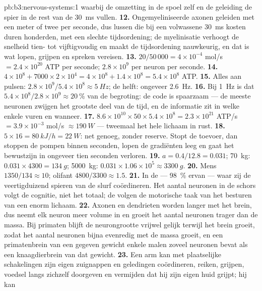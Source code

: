 \begin{solution}{pb:b3:nervous-systems:1}
waarbij de omzetting in de spoel zelf en de geleiding de spier in de
rest van de \qty{30}{ms} vullen.
\textbf{12.} Ongemyeliniseerde axonen geleiden met een meter of twee per
seconde, dus lussen die bij een volwassene \qty{30}{ms} kosten duren
honderden, met een slechte tijdsordening; de myelinisatie verhoogt de
snelheid tien- tot vijftigvoudig en maakt de tijdsordening nauwkeurig,
en dat is wat lopen, grijpen en spreken vereisen.
\textbf{13.} $20/50\,000 = 4\times 10^{-4}$ mol/s $= 2.4\times 10^{20}$
ATP per seconde; $2.8\times 10^{9}$ per neuron per seconde.
\textbf{14.} $4\times 10^{8} + 7000\times 2\times 10^{4} = 4\times 10^{8}
+ 1.4\times 10^{8} = 5.4\times 10^{8}$ ATP.
\textbf{15.} Alles aan pulsen: $2.8\times 10^{9}/5.4\times 10^{8} \approx
\qty{5}{Hz}$; de helft: ongeveer \qty{2.6}{Hz}.
\textbf{16.} Bij \qty{1}{Hz} is dat $5.4\times 10^{8}/2.8\times 10^{9} \approx
\qty{20}{\%}$ van de begroting: de code is spaarzaam --- de meeste
neuronen zwijgen het grootste deel van de tijd, en de informatie zit in
welke enkele vuren en wanneer.
\textbf{17.} $8.6\times 10^{10}\times 50\times 5.4\times 10^{8} = 2.3
\times 10^{21}$ ATP/s $= 3.9\times 10^{-3}$ mol/s $\approx \qty{190}{W}$
--- tweemaal het hele lichaam in rust.
\textbf{18.} $5\times 16 = \qty{80}{kJ/h} = \qty{22}{W}$: net genoeg,
zonder reserve. Stopt de toevoer, dan stoppen de pompen binnen seconden,
lopen de gradiënten leeg en gaat het bewustzijn in ongeveer tien
seconden verloren.
\textbf{19.} $a = 0.4/12.8 = 0.031$; \qty{70}{kg}: $0.031\times 4300 =
\qty{134}{g}$; \qty{5000}{kg}: $0.031\times 1.06\times 10^{5} \approx
\qty{3300}{g}$.
\textbf{20.} Mens $1350/134 \approx 10$; olifant $4800/3300 \approx
1.5$.
\textbf{21.} In de  --- \qty{98}{\%} ervan --- waar zij
de veertigduizend spieren van de slurf coördineren. Het aantal neuronen
in de schors volgt de cognitie, niet het totaal; de 
volgen de motorische taak van het besturen van een enorm lichaam.
\textbf{22.} Axonen en dendrieten worden langer met het brein, dus neemt
elk neuron meer volume in en groeit het aantal neuronen trager dan de
massa. Bij primaten blijft de neurongrootte vrijwel gelijk terwijl het
brein groeit, zodat het aantal neuronen bijna evenredig met de massa
groeit, en een primatenbrein van een gegeven gewicht enkele malen
zoveel neuronen bevat als een knaagdierbrein van dat gewicht.
\textbf{23.} Een arm kan met plaatselijke schakelingen zijn eigen
zuignappen en geledingen coördineren, reiken, grijpen, voedsel langs
zichzelf doorgeven en vermijden dat hij zijn eigen huid grijpt; hij kan

\end{solution}
